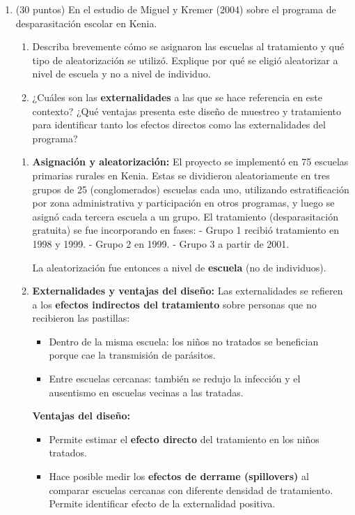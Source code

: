 \documentclass[10pt,a4paper]{article}
\begin{document}
\begin{enumerate}
\item (30 puntos) En el estudio de Miguel y Kremer (2004) sobre el programa de desparasitación escolar en Kenia.
   


\begin{enumerate}
    \item Describa brevemente cómo se asignaron las escuelas al tratamiento y qué tipo de aleatorización se utilizó. Explique por qué se eligió aleatorizar a nivel de escuela y no a nivel de individuo.

    \item  ¿Cuáles son las \textbf{externalidades} a las que se hace referencia en este contexto? 
     ¿Qué ventajas presenta este diseño de muestreo y tratamiento para identificar tanto los efectos directos como las externalidades del programa?
\end{enumerate}

{\color{blue}    \begin{enumerate}
    \item \textbf{Asignación y aleatorización:}  
    El proyecto se implementó en 75 escuelas primarias rurales en Kenia.  
    Estas se dividieron aleatoriamente en tres grupos de 25 (conglomerados) escuelas cada uno, 
    utilizando estratificación por zona administrativa y participación en otros programas, 
    y luego se asignó cada tercera escuela a un grupo.  
    El tratamiento (desparasitación gratuita) se fue incorporando en fases:  
    - Grupo 1 recibió tratamiento en 1998 y 1999.  
    - Grupo 2 en 1999.  
    - Grupo 3 a partir de 2001.  

    La aleatorización fue entonces a nivel de \textbf{escuela} (no de individuos).  
   

    \item \textbf{Externalidades y ventajas del diseño:}  
    Las externalidades se refieren a los \textbf{efectos indirectos del tratamiento} sobre personas que no recibieron las pastillas:  
    \begin{itemize}
        \item Dentro de la misma escuela: los niños no tratados se benefician porque cae la transmisión de parásitos.  
        \item Entre escuelas cercanas: también se redujo la infección y el ausentismo en escuelas vecinas a las tratadas.  
    \end{itemize}

    \textbf{Ventajas del diseño:}  
    \begin{itemize}
        \item Permite estimar el \textbf{efecto directo} del tratamiento en los niños tratados.  
        \item Hace posible medir los \textbf{efectos de derrame (spillovers)} al comparar escuelas cercanas con diferente densidad de tratamiento.  Permite identificar efecto de la externalidad positiva.
       
    \end{itemize}
\end{enumerate}}

\end{enumerate}
\end{document}
